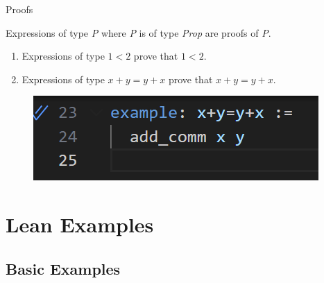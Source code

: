 \documentclass[xcolor=dvipsnames]{beamer}
\begin{document}
\begin{frame}{Proofs}


Expressions of type \textit{P} where \textit{P} is of type \textit{Prop} are proofs of \textit{P}. 
    
\begin{enumerate}
    \item Expressions of type $1<2$ prove that $1<2$.
    \item Expressions of type $x+y=y+x$ prove that $x+y=y+x$. 
\end{enumerate}


\begin{figure}
    \centering
    \includegraphics[width=1\linewidth]{example_proof_proofs_section.png}
\end{figure}

\end{frame}







\section{Lean Examples}

\subsection{Basic Examples}
\end{document}

